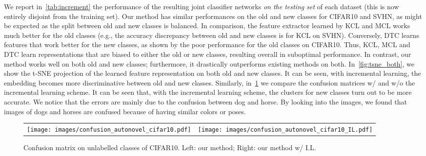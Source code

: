 We report in~\cref{tab:increment} the performance of the resulting joint classifier networks \emph{on the testing set} of each dataset (this is now entirely disjoint from the training set).
Our method has similar performances on the old and new classes for CIFAR10 and SVHN, as might be expected as the split between old and new classes is balanced.
In comparison, the feature extractor learned by KCL and MCL works much better for the old classes (e.g., the accuracy discrepancy between old and new classes is  for KCL on SVHN).
Conversely, DTC learns features that work better for the new classes, as shown by the poor performance for the old classes on CIFAR10.
Thus, KCL, MCL and DTC learn representations that are biased to either the old or new classes, resulting overall in suboptimal performance.
In contrast, our method works well on both old and new classes; furthermore, it drastically outperforms existing methods on both.
In~\cref{fig:tsne_both}, we show the t-SNE projection of the learned feature representation on both old and new classes. It can be seen, with incremental learning, the embedding becomes more discriminative between old and new classes. Similarly, in~\cref{fig:conf_cifar5} we compare the confusion matrices w/ and w/o the incremental learning scheme. It can be seen that, with the incremental learning scheme, the clusters for new classes turn out to be more accurate. We notice that the errors are mainly due to the confusion between dog and horse. By looking into the images, we found that images of dogs and horses are confused because of having similar colors or poses.


\begin{figure}
\centering
\tabcolsep=0.02cm
\renewcommand{\arraystretch}{0.25}
\begin{tabular}[b]{cc}
    {\texttt{[image: images/confusion\_autonovel\_cifar10.pdf]}} &
    {\texttt{[image: images/confusion\_autonovel\_cifar10\_IL.pdf]}} \\
\end{tabular}\hfill \caption{Confusion matrix on unlabelled classes of CIFAR10. Left: our method; Right: our method w/ I.L.}
\label{fig:conf_cifar5}
\end{figure}



